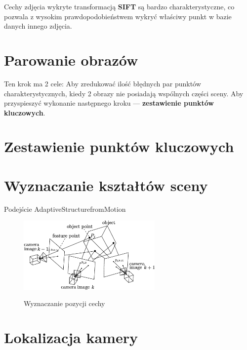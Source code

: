 Cechy zdjęcia wykryte transformacją \textbf{SIFT} są bardzo charakterystyczne, co pozwala z wysokim prawdopodobieństwem wykryć właściwy punkt w bazie danych innego zdjęcia.

\section{Parowanie obrazów}
Ten krok ma 2 cele:
Aby zredukować ilość błędnych par punktów charakterystycznych, kiedy 2 obrazy nie posiadają wspólnych części sceny.
Aby przyspieszyć wykonanie następnego kroku --- \textbf{zestawienie punktów kluczowych}.

\section{Zestawienie punktów kluczowych}

\section{Wyznaczanie kształtów sceny}
Podejście AdaptiveStructurefromMotion

\begin{figure}[h]
   \centering
   \includegraphics[width=7cm]{SfM.png}
   \label {fig:SfM}
   \caption{Wyznaczanie pozycji cechy}
\end{figure}
\section{Lokalizacja kamery}
